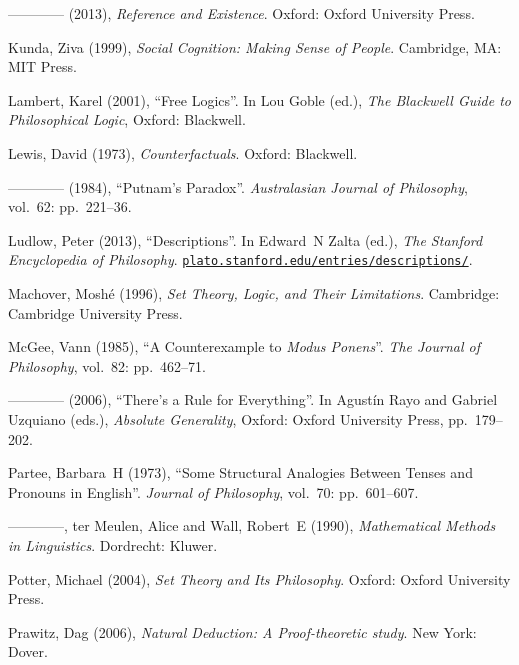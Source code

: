 \documentclass[openany,leqno,10pt]{book}
\theoremstyle{break}
\theoremstyle{definition}
\theoremstyle{remark}
\begin{document}
{\begin{thebibliography}{39}
---\!\!---\!\!---\!\!--- (2013), \emph{Reference and Existence}. Oxford:
  Oxford University Press.

Kunda, Ziva (1999), \emph{Social Cognition: Making Sense of People}.
  Cambridge, MA: MIT Press.

Lambert, Karel (2001), \enquote{Free Logics}. In Lou Goble (ed.), \emph{The
  Blackwell Guide to Philosophical Logic}, Oxford: Blackwell.

Lewis, David (1973), \emph{Counterfactuals}. Oxford: Blackwell.

---\!\!---\!\!---\!\!--- (1984), \enquote{Putnam's Paradox}. \emph{Australasian
  Journal of Philosophy}, vol.~62: pp.~221–36.

Ludlow, Peter (2013), \enquote{Descriptions}. In Edward~N Zalta (ed.), \emph{The Stanford Encyclopedia of Philosophy}. \urlprefix\href{http://plato.stanford.edu/entries/descriptions/}{\nolinkurl{plato.stanford.edu/entries/descriptions/}}.

Machover, Moshé (1996), \emph{Set Theory, Logic, and Their Limitations}.
  Cambridge: Cambridge University Press.

McGee, Vann (1985), \enquote{A Counterexample to \emph{Modus Ponens}}. \emph{The Journal of Philosophy}, vol.~82: pp.~462–71.

---\!\!---\!\!---\!\!--- (2006), \enquote{There's a Rule for Everything}. In Agustín Rayo and Gabriel Uzquiano (eds.), \emph{Absolute Generality}, Oxford: Oxford
  University Press, pp.~179–202.

Partee, Barbara~H (1973), \enquote{Some Structural Analogies Between Tenses and Pronouns in English}. \emph{Journal of Philosophy}, vol.~70: pp.~601–607. 

---\!\!---\!\!---\!\!---, {ter Meulen}, Alice and Wall, Robert~E (1990), \emph{Mathematical Methods in Linguistics}. Dordrecht: Kluwer.

Potter, Michael (2004), \emph{Set Theory and Its Philosophy}. Oxford: Oxford
  University Press.

Prawitz, Dag (2006), \emph{Natural Deduction: A Proof-theoretic study}. New
  York: Dover.


\end{thebibliography}}
\end{document}
